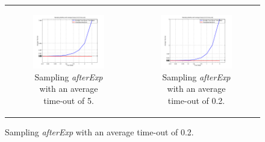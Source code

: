 \begin{figure}
\begin{center}
	\begin{tabular}{c c}
		\begin{subfigure}[b]{0.5\textwidth}
			\centering
			\includegraphics[width=.6\textwidth, angle=0]{./../shared/fig/sampling/samplingTest_afterExp_5time.png}
			\caption{Sampling \textit{afterExp} with an average time-out of 5.}
			\label{fig:sampling_afterExp_5time}
		\end{subfigure}

		& 

		\begin{subfigure}[b]{0.5\textwidth}
			\centering
			\includegraphics[width=.6\textwidth, angle=0]{./../shared/fig/sampling/samplingTest_afterExp_02time.png}
			\caption{Sampling \textit{afterExp} with an average time-out of 0.2.}
			\label{fig:sampling_afterExp_02time}
		\end{subfigure}

		\\ 
		

\end{tabular}
\end{center}
\end{figure}
